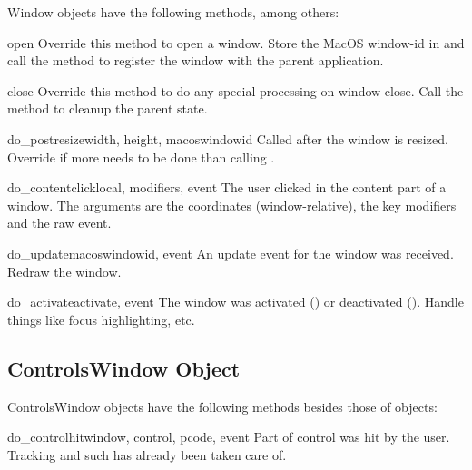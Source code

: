 Window objects have the following methods, among others:


\begin{methoddesc}[Window]{open}{}
Override this method to open a window. Store the MacOS window-id in
 and call the  method to
register the window with the parent application.
\end{methoddesc}

\begin{methoddesc}[Window]{close}{}
Override this method to do any special processing on window
close. Call the  method to cleanup the parent
state.
\end{methoddesc}

\begin{methoddesc}[Window]{do_postresize}{width, height, macoswindowid}
Called after the window is resized. Override if more needs to be done
than calling .
\end{methoddesc}

\begin{methoddesc}[Window]{do_contentclick}{local, modifiers, event}
The user clicked in the content part of a window. The arguments are
the coordinates (window-relative), the key modifiers and the raw
event.
\end{methoddesc}

\begin{methoddesc}[Window]{do_update}{macoswindowid, event}
An update event for the window was received. Redraw the window.
\end{methoddesc}

\begin{methoddesc}[Window]{do_activate}{activate, event}
The window was activated () or deactivated
(). Handle things like focus highlighting,
etc.
\end{methoddesc}


\subsection{ControlsWindow Object \label{controlswindow-object}}

ControlsWindow objects have the following methods besides those of
 objects:


\begin{methoddesc}[ControlsWindow]{do_controlhit}{window, control,
                                                  pcode, event}
Part  of control  was hit by the
user. Tracking and such has already been taken care of.
\end{methoddesc}



